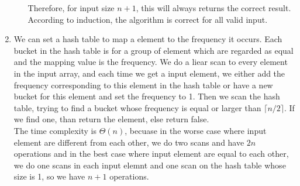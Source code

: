 \documentclass[12pt,letterpaper]{article}
\begin{document}
\begin{enumerate}[label=\arabic*.]
\begin{enumerate}
				Therefore, for input size $n+1$, this will always returns the correct result. According to induction, the algorithm is correct for all valid input.
		\end{enumerate}
	\item We can set a hash table to map a element to the frequency it occurs. Each bucket in the hash table is for a group of element which are regarded as equal and the mapping value is the frequency. We do a liear scan to every element in the input array, and each time we get a input element, we either add the frequency corresponding to this element in the hash table or have a new bucket for this element and set the frequency to 1. Then we scan the hash table, trying to find a bucket whose frequency is equal or larger than $\lceil n/2\rceil$. If we find one, than return the element, else return false.\\
		The time complexity is $\Theta(n)$, becuase in the worse case where input element are different from each other, we do two scans and have $2n$ operations and in the best case where input element are equal to each other, we do one scans in each input elemnt and one scan on the hash table whose size is 1, so we have $n+1$ operations.\\
\end{enumerate}
\end{document}
